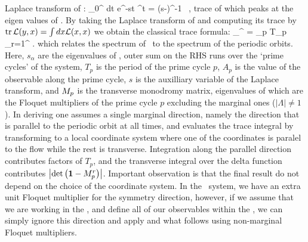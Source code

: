 Laplace transform of : 
\beq
	\int_0^{\infty} dt e^{-st} \Lop^t = (s-\Aop)^{-1} \, ,
	\label{eq-ResoolventA}
\eeq
trace of which peaks at the eigen values of \Aop. By taking the
Laplace transform of  and computing its trace 
by $\mbox{\rm tr}\, {\cal L} (y,x) = \int dx {\cal L} (x,x)$ we obtain the
classical trace formula:
\beq
\sum_{}^{\infty}  = \sum_p T_p 
\sum_{r=1}^{\infty}  .
which relates the spectrum of \Aop\ to the spectrum of the periodic 
orbits. Here, $s_{\alpha}$ are the eigenvalues of \Aop , 
outer sum on the RHS runs over the `prime cycles' of the system, 
$T_p$ is the period of the prime cycle $p$, $A_p$ is the value of 
the observable along the prime cycle, $s$ is the auxilliary
variable of the Laplace transform, and $M_p$ is the transverse 
monodromy matrix, eigenvalues of which are the Floquet multipliers of the prime 
cycle $p$ excluding the marginal ones ($|\Lambda| \neq 1$). In deriving  
 one assumes a single marginal direction, namely 
the direction that is parallel to the periodic orbit at all times, and evaluates 
the trace integral by transforming to a local coordinate system where one of the 
coordinates is paralel to the flow while the rest is transverse. Integration along
the parallel direction contributes factors of $T_p$, and the transverse integral
over the delta function contributes $\left|\mbox{\rm det}\,\!\left({\bf 1}-M_p^{r}\right)\right|$. Important observation is that
the final result  do not depend on the choice
of the coordinate system. In the \twomode\ system, we have an extra unit Floquet
multiplier for the symmetry direction, however, if we assume that we are working
in the \slice , and define all of our observables within the \slice , we can 
simply ignore this direction and apply  and what
follows using non-marginal Floquet multipliers. 

